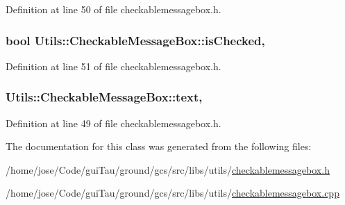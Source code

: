 Definition at line 50 of file checkablemessagebox.\-h.

\hypertarget{class_utils_1_1_checkable_message_box_a344ff6c020a0351070685083aba8c3ab}{
\subsubsection[{is\-Checked}]{\setlength{\rightskip}{0pt plus 5cm}bool Utils\-::\-Checkable\-Message\-Box\-::is\-Checked\hspace{0.3cm}{\ttfamily [read]}, {\ttfamily [write]}}}\label{class_utils_1_1_checkable_message_box_a344ff6c020a0351070685083aba8c3ab}


Definition at line 51 of file checkablemessagebox.\-h.

\hypertarget{class_utils_1_1_checkable_message_box_a2fa5240368beedd12fb217a593410aae}{
\subsubsection[{text}]{ Utils\-::\-Checkable\-Message\-Box\-::text\hspace{0.3cm}{\ttfamily [read]}, {\ttfamily [write]}}}\label{class_utils_1_1_checkable_message_box_a2fa5240368beedd12fb217a593410aae}


Definition at line 49 of file checkablemessagebox.\-h.



The documentation for this class was generated from the following files\-:\begin{DoxyCompactItemize}
\item 
/home/jose/\-Code/gui\-Tau/ground/gcs/src/libs/utils/\hyperlink{checkablemessagebox_8h}{checkablemessagebox.\-h}\item 
/home/jose/\-Code/gui\-Tau/ground/gcs/src/libs/utils/\hyperlink{checkablemessagebox_8cpp}{checkablemessagebox.\-cpp}\end{DoxyCompactItemize}
